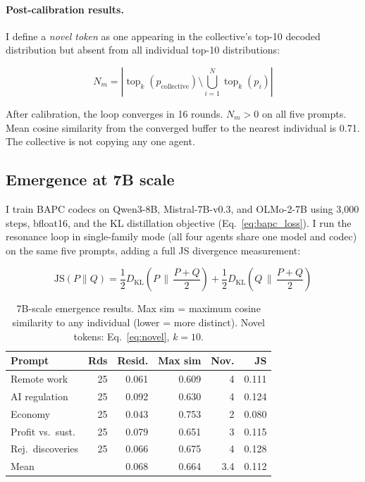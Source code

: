 \documentclass[10pt,twocolumn]{article}
\begin{document}
\paragraph{Post-calibration results.}
I define a \textit{novel token} as one appearing in the collective's top-10 decoded distribution but absent from all individual top-10 distributions:

\begin{equation}
    N_m = \left|\operatorname{top}_k(p_{\text{collective}}) \setminus \bigcup_{i=1}^{N} \operatorname{top}_k(p_i)\right|
    \label{eq:novel}
\end{equation}

After calibration, the loop converges in 16 rounds. $N_m > 0$ on all five prompts. Mean cosine similarity from the converged buffer to the nearest individual is 0.71. The collective is not copying any one agent.

\subsection{Emergence at 7B scale}
\label{sec:emergence7b}

I train BAPC codecs on Qwen3-8B, Mistral-7B-v0.3, and OLMo-2-7B using 3,000 steps, bfloat16, and the KL distillation objective (Eq.~\ref{eq:bapc_loss}). I run the resonance loop in single-family mode (all four agents share one model and codec) on the same five prompts, adding a full JS divergence measurement:

\begin{equation}
    \text{JS}(P \| Q) = \frac{1}{2} D_{\text{KL}}\!\left(P \,\Big\|\, \frac{P+Q}{2}\right) + \frac{1}{2} D_{\text{KL}}\!\left(Q \,\Big\|\, \frac{P+Q}{2}\right)
    \label{eq:js}
\end{equation}

\begin{table}[h]
\centering
\caption{7B-scale emergence results. Max sim = maximum cosine similarity to any individual (lower = more distinct). Novel tokens: Eq.~\ref{eq:novel}, $k{=}10$.}
\label{tab:emergence7b}
\small
\setlength{\tabcolsep}{4pt}
\begin{tabular}{lrrrrr}
\toprule
Prompt & Rds & Resid. & Max sim & Nov. & JS \\
\midrule
Remote work        & 25 & 0.061 & 0.609 & 4 & 0.111 \\
AI regulation      & 25 & 0.092 & 0.630 & 4 & 0.124 \\
Economy            & 25 & 0.043 & 0.753 & 2 & 0.080 \\
Profit vs.\ sust.  & 25 & 0.079 & 0.651 & 3 & 0.115 \\
Rej.\ discoveries  & 25 & 0.066 & 0.675 & 4 & 0.128 \\
\midrule
Mean               &    & 0.068 & 0.664 & 3.4 & 0.112 \\
\bottomrule
\end{tabular}
\end{table}
\end{document}
